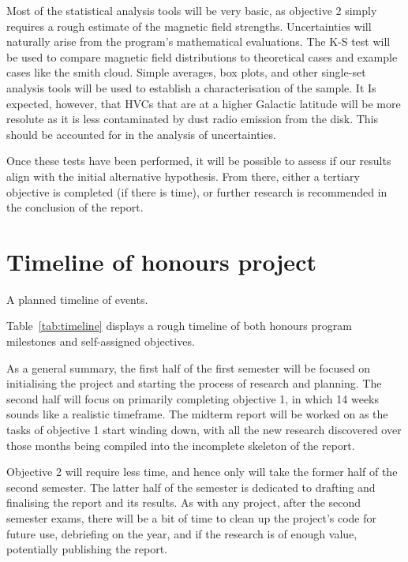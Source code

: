 Most of the statistical analysis tools will be very basic, as objective 2 simply requires a rough estimate of the magnetic field strengths. Uncertainties will naturally arise from the program's mathematical evaluations. The K-S test will be used to compare magnetic field distributions to theoretical cases and example cases like the smith cloud. Simple averages, box plots, and other single-set analysis tools will be used to establish a characterisation of the sample. It Is expected, however, that HVCs that are at a higher Galactic latitude will be more resolute as it is less contaminated by dust radio emission from the disk. This should be accounted for in the analysis of uncertainties.

Once these tests have been performed, it will be possible to assess if our results align with the initial alternative hypothesis. From there, either a tertiary objective is completed (if there is time), or further research is recommended in the conclusion of the report.

\section{Timeline of honours project}
\label{sec:timeline}

\begin{table}[ht]
  \centering
  
  \caption{A planned timeline of events.}
  \label{tab:timeline}
\end{table}

Table~\ref{tab:timeline} displays a rough timeline of both honours program milestones and self-assigned objectives.

As a general summary, the first half of the first semester will be focused on initialising the project and starting the process of research and planning. The second half will focus on primarily completing objective 1, in which 14 weeks sounds like a realistic timeframe. The midterm report will be worked on as the tasks of objective 1 start winding down, with all the new research discovered over those months being compiled into the incomplete skeleton of the report.

Objective 2 will require less time, and hence only will take the former half of the second semester. The latter half of the semester is dedicated to drafting and finalising the report and its results. As with any project, after the second semester exams, there will be a bit of time to clean up the project's code for future use, debriefing on the year, and if the research is of enough value, potentially publishing the report.

